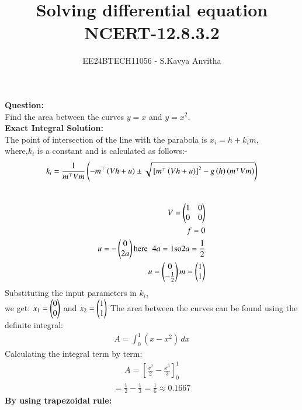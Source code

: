 \documentclass[journal]{IEEEtran}
\begin{document}

\vspace{3cm}

\title{Solving differential equation\\NCERT-12.8.3.2}
\author{EE24BTECH11056 - S.Kavya Anvitha}
\maketitle
\bigskip

\renewcommand{\thefigure}{\theenumi}
\renewcommand{\thetable}{\theenumi}
\textbf{Question:}\\
Find the area between the curves $y = x$ and $y = x^2$.\\
\textbf{Exact Integral Solution:}\\
The point of intersection of the line with the parabola is $x_i=h+k_i m$,\\
where,$k_i$ is a constant and is calculated as follows:-
$$k_i=\frac{1}{m^\top Vm}\left(-m^\top \left(Vh+u\right)\pm \sqrt{{}\left[m^\top \left(Vh+u\right)\right]^2-g\left(h\right)\left(m^\top Vm\right)}\right)$$\\
\begin{align}
 V = \begin{pmatrix}1 & 0\\0 & 0\end{pmatrix}\\
 f = 0\\
 u = -\begin{pmatrix}0 \\ 2a\end{pmatrix} \text{here} \hspace{2mm} 4a = 1 \text{so} 2a = \frac{1}{2}\\
 u = \begin{pmatrix}0\\-\frac{1}{2}\end{pmatrix}
 m = \begin{pmatrix}1\\1\end{pmatrix}
\end{align}
Substituting the input parameters in $k_i$,\\
we get: $x_1 = \begin{pmatrix}0\\0\end{pmatrix}$ and $x_2 = \begin{pmatrix}1\\1\end{pmatrix}$
The area between the curves can be found using the definite integral:
\begin{align}
    A = \int_{0}^{1} (x - x^2) \, dx
\end{align}
 Calculating the integral term by term:
\begin{align}
    A = \left[ \frac{x^2}{2} - \frac{x^3}{3} \right]_0^1
\end{align}
\begin{align}
    = \frac{1}{2} - \frac{1}{3} = \frac{1}{6} \approx 0.1667
\end{align}
\textbf{By using trapezoidal rule:}\\
\end{document}
